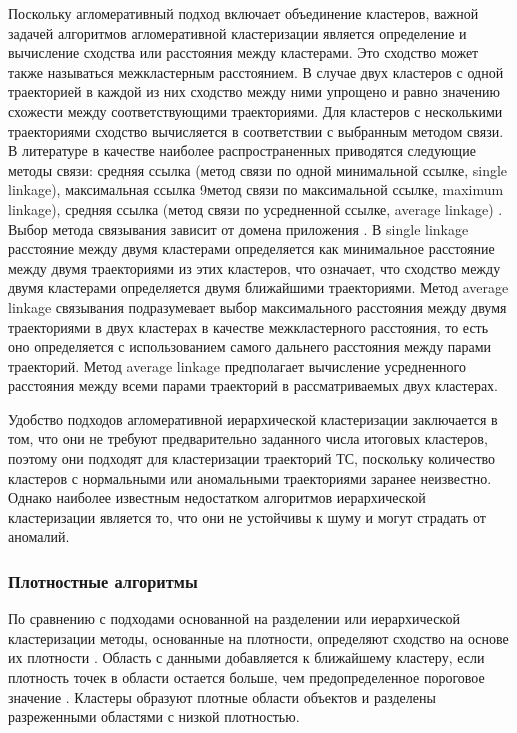 Поскольку агломеративный подход включает объединение кластеров, важной задачей алгоритмов агломеративной кластеризации является определение и вычисление сходства или расстояния между кластерами. Это сходство может также называться межкластерным расстоянием. В случае двух кластеров с одной траекторией в каждой из них сходство между ними упрощено и равно значению схожести между соответствующими траекториями. Для кластеров с несколькими траекториями сходство вычисляется в соответствии с выбранным методом связи. В литературе в качестве наиболее распространенных приводятся следующие методы связи: средняя ссылка (метод связи по одной минимальной ссылке, single linkage), максимальная ссылка 9метод связи по максимальной ссылке, maximum linkage), средняя ссылка (метод связи по усредненной ссылке, average linkage) \cite{article:23_survey_ca}\cite{inproceedings:7_related_work}. Выбор метода связывания зависит от домена приложения \cite{online:what_is_hier_clust}. В single linkage расстояние между двумя кластерами определяется как минимальное расстояние между двумя траекториями из этих кластеров, что означает, что сходство между двумя кластерами определяется двумя ближайшими траекториями. Метод average linkage связывания подразумевает выбор максимального расстояния между двумя траекториями в двух кластерах в качестве межкластерного расстояния, то есть оно определяется с использованием самого дальнего расстояния между парами траекторий. Метод average linkage предполагает вычисление усредненного расстояния между всеми парами траекторий в рассматриваемых двух кластерах.

Удобство подходов агломеративной иерархической кластеризации заключается в том, что они не требуют предварительно заданного числа итоговых кластеров, поэтому они подходят для кластеризации траекторий ТС, поскольку количество кластеров с нормальными или аномальными траекториями заранее неизвестно. Однако наиболее известным недостатком алгоритмов иерархической кластеризации является то, что они не устойчивы к шуму и могут страдать от аномалий.

\subsubsection{Плотностные алгоритмы}

По сравнению с подходами основанной на разделении или иерархической кластеризации методы, основанные на плотности, определяют сходство на основе их плотности \cite{article:22_survey_dscc}. Область с данными добавляется к ближайшему кластеру, если плотность точек в области остается больше, чем предопределенное пороговое значение \cite{article:8_review_mot_cl_alg}. Кластеры образуют плотные области объектов и разделены разреженными областями с низкой плотностью.

